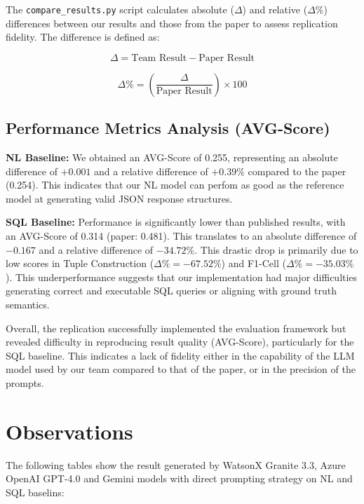 \documentclass[12pt]{article}
\begin{document}
The \texttt{compare\_results.py} script calculates absolute ($\Delta$) and relative ($\Delta\%$) differences between our results and those from the paper to assess replication fidelity. The difference is defined as:

\[
\Delta = \text{Team Result} - \text{Paper Result}
\]

\[
\Delta\% = \left( \frac{\Delta}{\text{Paper Result}} \right) \times 100
\]

\subsection{Performance Metrics Analysis (AVG-Score)}

\textbf{NL Baseline:}  
We obtained an AVG-Score of 0.255, representing an absolute difference of $+0.001$ and a relative difference of $+0.39\%$ compared to the paper (0.254). This indicates that our NL model can perfom as good as the reference model at generating valid JSON response structures.

\noindent \textbf{SQL Baseline:}  
Performance is significantly lower than published results, with an AVG-Score of 0.314 (paper: 0.481). This translates to an absolute difference of $-0.167$ and a relative difference of $-34.72\%$. This drastic drop is primarily due to low scores in Tuple Construction ($\Delta\% = -67.52\%$) and F1-Cell ($\Delta\% = -35.03\%$). This underperformance suggests that our implementation had major difficulties generating correct and executable SQL queries or aligning with ground truth semantics.

Overall, the replication successfully implemented the evaluation framework but revealed difficulty in reproducing result quality (AVG-Score), particularly for the SQL baseline. This indicates a lack of fidelity either in the capability of the LLM model used by our team compared to that of the paper, or in the precision of the prompts.


\section{Observations}

The following tables show the result generated by WatsonX Granite 3.3, Azure OpenAI GPT-4.0 and Gemini models with direct prompting strategy on NL and SQL baselins:

\begin{table}[h!]
\centering
{}
\caption{NL baseline results with Watsonx}
\end{table}
\end{document}
